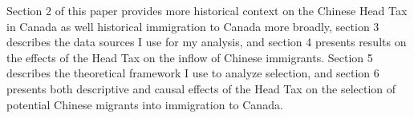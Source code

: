Section 2 of this paper provides more historical context on the Chinese Head Tax in Canada as well historical immigration to Canada more broadly, section 3 describes the data sources I use for my analysis, and section 4 presents results on the effects of the Head Tax on the inflow of Chinese immigrants. Section 5 describes the theoretical framework I use to analyze selection, and section 6 presents both descriptive and causal effects of the Head Tax on the selection of potential Chinese migrants into immigration to Canada.
